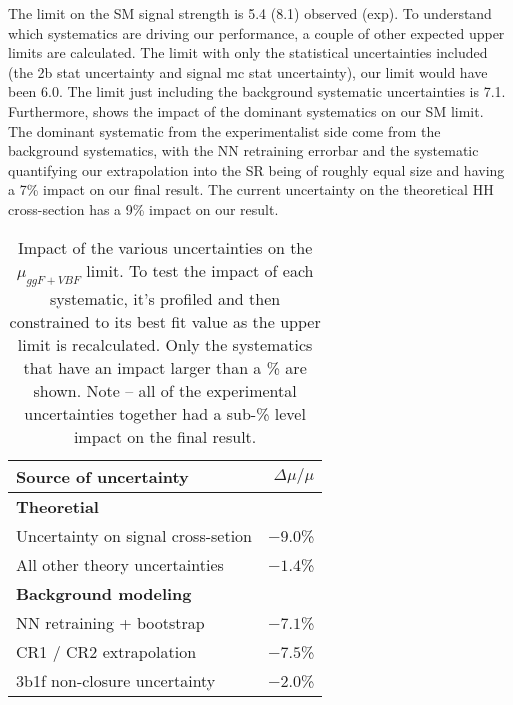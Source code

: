 The limit on the SM signal strength is 5.4 (8.1) observed (exp). 
To understand which systematics are driving our performance, a couple of other expected upper limits are calculated.
The limit with only the statistical uncertainties included (the 2b stat uncertainty and signal mc stat uncertainty), our limit would have been 6.0. The limit just including the background systematic uncertainties is 7.1. Furthermore, \Tab{\ref{tab:systematics}} shows the impact of the dominant systematics on our SM limit. The dominant systematic from the experimentalist side come from the background systematics, with the NN retraining errorbar and the systematic quantifying our extrapolation into the SR being of roughly equal size and having a 7\% impact on our final result. The current uncertainty on the theoretical HH cross-section has a 9\% impact on our result. 
\begin{table}%
	\centering
	\begin{tabular}{l r}
	\toprule
		   Source of uncertainty \qquad & $ \Delta \mu / \mu$ \\
             \hline
             \textbf{Theoretial}                                        &   \\
                         Uncertainty on signal cross-setion               & $-9.0$\%  \\
                         All other theory uncertainties                        & $-1.4$\%  \\
              \hline
              \textbf{Background modeling }                                &   \\
                         NN retraining + bootstrap                             &  $-7.1$\%  \\
                         CR1 / CR2 extrapolation                              &  $-7.5$\%  \\
                         3b1f non-closure uncertainty                       &  $-2.0$\%  \\
              \bottomrule

	\end{tabular}	
\caption{Impact of the various uncertainties on the $\mu_{ggF+VBF}$ limit.
To test the impact of each systematic, it's profiled and then constrained to its best fit value as the upper limit is recalculated.
Only the systematics that have an impact larger than a \% are shown. 
Note -- all of the experimental uncertainties together had a sub-\% level impact on the final result.}
\label{tab:systematics}
\end{table}

